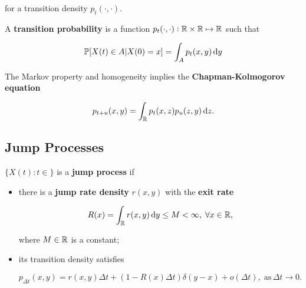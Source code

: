 for a transition density $p_t(\cdot, \cdot)$.

\begin{definition}
    A \textbf{transition probability} is a function $p_t(\cdot, \cdot): \mathbb{R} \times \mathbb{R} \mapsto \mathbb{R}$ such that 

    \begin{equation*}
        \Prob[X(t) \in A | X(0) = x] = \int_A p_t(x,y) \dif y
    \end{equation*}
\end{definition}

\begin{theorem}
    The Markov property and homogeneity implies the \textbf{Chapman-Kolmogorov equation} 

    \begin{equation*}
        p_{t+u}(x, y) = \int_\mbb{R} p_t(x, z) p_u(z, y) \dif z.
    \end{equation*}
\end{theorem}

\subsection{Jump Processes}

\begin{definition}
    $\{X(t): t \in \}$ is a \textbf{jump process} if 
    
    \begin{itemize}
        \item there is a \textbf{jump rate density} $r(x,y)$ with the \textbf{exit rate} 

        \begin{equation*}
            R(x) = \int_\mbb{R} r(x,y) \dif y \le M < \infty, \; \forall x \in \mbb{R},
        \end{equation*}
    
        where $M \in \mathbb{R}$ is a constant;

        \item its transition density satisfies 
        
        \begin{equation*}
            p_{\Delta t}(x, y) = r(x, y) \Delta t + \left( 1 - R(x) \Delta t \right) \delta(y - x) + o(\Delta t), \; \text{as} \, \Delta t \to 0.
        \end{equation*}
    \end{itemize}
\end{definition}


